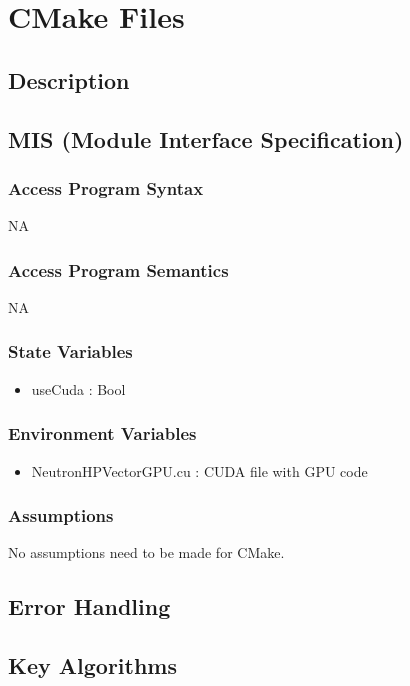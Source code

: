 \documentclass[12pt]{article}
\begin{document}
\section{CMake Files}
\subsection{Description}
\subsection{MIS (Module Interface Specification)}
\subsubsection{Access Program Syntax}%
NA

\subsubsection{Access Program Semantics}%
NA

\subsubsection{State Variables}%
\begin{itemize}
\item useCuda : Bool
\end{itemize}

\subsubsection{Environment Variables}%
\begin{itemize}
\item NeutronHPVectorGPU.cu : CUDA file with GPU code
\end{itemize}


\subsubsection{Assumptions}%
No assumptions need to be made for CMake.

\subsection{Error Handling}

\subsection{Key Algorithms}
\end{document}
